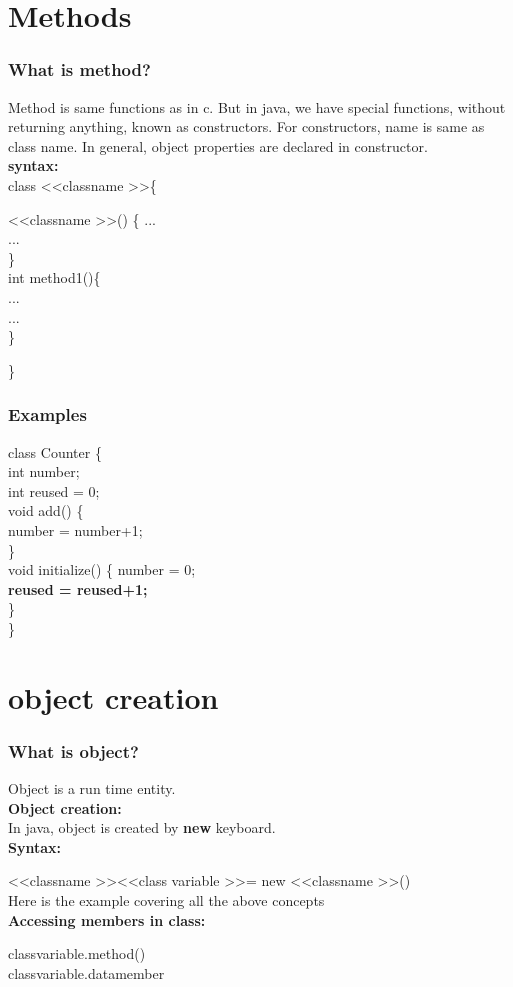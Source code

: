\documentclass{beamer}
\begin{document}
\section{Methods}
\begin{frame}
    \frametitle{What is method?}
    Method is same functions as in c. But in java, we have special functions, without returning anything, known as constructors. For constructors, name is same as class name. In general, object properties are declared in constructor.\\
    \textbf{syntax:}\\


    class \textless\textless classname \textgreater\textgreater \{


        \textless\textless classname \textgreater\textgreater() \{
           ...\\
           ... \\
        \}\\
        int  method1()\{\\
        ...\\
        ...\\
        \}

        \}
\end{frame}
\begin{frame}
\frametitle{Examples}
class Counter \{\\
int number;\\
int reused = 0;\\
void add() \{\\
number = number+1;\\
\}\\
void initialize() \{
number = 0;\\
\textbf{reused = reused+1;}\\
\}\\
\}\\
\end{frame}
\section{object creation}
\begin{frame}
    \frametitle{What is object?}
    Object is a run time entity.\\
\textbf{Object creation:}\\
In java, object is created by \textbf{new} keyboard. \\

\textbf{Syntax:}


\textless\textless classname \textgreater\textgreater  \textless\textless class variable \textgreater\textgreater = new \textless\textless classname \textgreater\textgreater()\\

Here is the example covering all the above concepts \href{class_object.java}{\color{green}{classobject}}\\

\textbf{Accessing members in class:}

classvariable.method()\\
classvariable.datamember
\end{frame}
\end{document}
